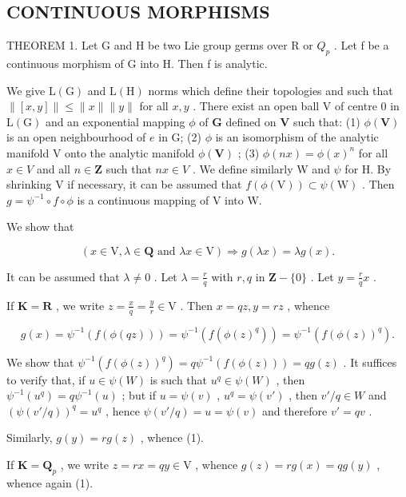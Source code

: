 \subsection{CONTINUOUS MORPHISMS}

THEOREM 1. Let G and H be two Lie group germs over R or \(Q_{p}\) . Let f be a continuous morphism of G into H. Then f is analytic.

We give \(\mathrm{L}(\mathrm{G})\) and \(\mathrm{L}(\mathrm{H})\) norms which define their topologies and such that \(\| [x,y]\| \leqslant \| x\| \| y\|\) for all \(x,y\) . There exist an open ball V of centre 0 in \(\mathrm{L}(\mathrm{G})\) and an exponential mapping \(\phi\) of \(\mathbf{G}\) defined on \(\mathbf{V}\) such that: (1) \(\phi (\mathbf{V})\) is an open neighbourhood of \(e\) in G; (2) \(\phi\) is an isomorphism of the analytic manifold V onto the analytic manifold \(\phi (\mathbf{V})\) ; (3) \(\phi (nx) = \phi (x)^n\) for all \(x\in V\) and all \(n\in \mathbf{Z}\) such that \(nx\in V\) . We define similarly W and \(\psi\) for H. By shrinking V if necessary, it can be assumed that \(f(\phi (\mathrm{V}))\subset \psi (\mathrm{W})\) . Then \(g = \psi^{-1}\circ f\circ \phi\) is a continuous mapping of V into W.

We show that

\[
(x \in \mathrm{V}, \lambda \in \mathbf {Q} \text {   and   } \lambda x \in \mathrm{V}) \Rightarrow g (\lambda x) = \lambda g (x).\tag{1}
\]

It can be assumed that \(\lambda \neq 0\) . Let \(\lambda = \frac{r}{q}\) with \(r, q\) in \(\mathbf{Z} - \{0\}\) . Let \(y = \frac{r}{q} x\) .

If \(\mathbf{K} = \mathbf{R}\) , we write \(z = \frac{x}{q} = \frac{y}{r} \in \mathrm{V}\) . Then \(x = qz, y = rz\) , whence

\[
g (x) = \psi^ {- 1} (f (\phi (q z))) = \psi^ {- 1} (f (\phi (z) ^ {q})) = \psi^ {- 1} (f (\phi (z)) ^ {q}).
\]

We show that \(\psi^{-1}(f(\phi(z))^q) = q\psi^{-1}(f(\phi(z))) = qg(z)\) . It suffices to verify that, if \(u \in \psi(W)\) is such that \(u^q \in \psi(W)\) , then \(\psi^{-1}(u^q) = q\psi^{-1}(u)\) ; but if \(u = \psi(v)\) , \(u^q = \psi(v')\) , then \(v'/q \in W\) and \((\psi(v'/q))^q = u^q\) , hence \(\psi(v'/q) = u = \psi(v)\) and therefore \(v' = qv\) .

Similarly, \(g(y) = rg(z)\) , whence (1).

If \(\mathbf{K} = \mathbf{Q}_p\) , we write \(z = rx = qy \in \mathrm{V}\) , whence \(g(z) = rg(x) = qg(y)\) , whence again (1).


